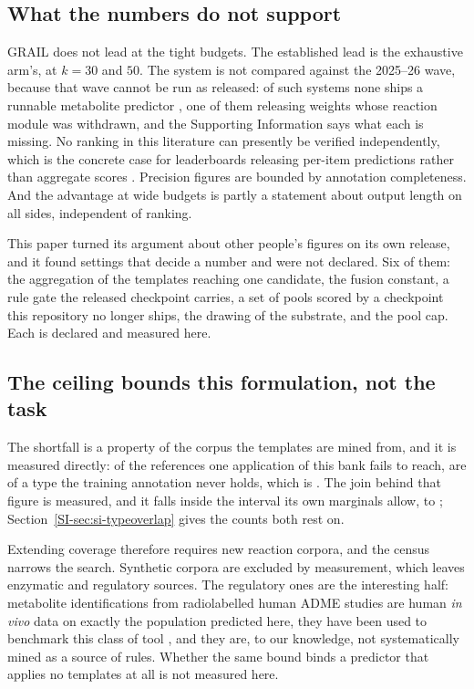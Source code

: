 \subsection{What the numbers do not support}

GRAIL does not lead at the tight budgets.  The established lead is the exhaustive arm's, at $k=30$ and $50$. The system is not compared against the 2025--26 wave, because that wave cannot be run as
released: of \numComparatorsUnavailableWord{} such systems none ships a runnable metabolite
predictor \citep{Larsson_2025, Zhou_2025, Zhou_2026, Chavan_2026}, one of them releasing weights
whose reaction module was withdrawn, and the Supporting Information says what each is missing. No ranking in this literature can presently be verified independently, which
is the concrete case for leaderboards releasing per-item predictions rather than aggregate scores
\citep{Rodriguez_2021, Mishra_2021}. Precision figures are bounded by annotation completeness. And the advantage at
wide budgets is partly a statement about output length on all sides, independent of ranking.

This paper turned its argument about other people's figures on its own release, and it
found settings that decide a number and were not declared. Six of them: the aggregation of the templates reaching one candidate, the fusion constant, a rule gate the released checkpoint carries, a set of pools scored by a checkpoint this repository no longer ships, the drawing of the substrate, and the pool cap. Each is declared and measured here.

\subsection{The ceiling bounds this formulation, not the task}

The shortfall is a property of the corpus the templates are mined from, and it is measured directly: of the \numCeilingUncovered{} references one
application of this bank fails to reach, \numContainmentAbsent{} are of a type the training
annotation never holds, which is \numContainmentShortfallsharePct{}. The join behind that figure is
measured, and it falls inside the interval its own marginals allow, \numBoundShortfallsharemin{}
to \numBoundShortfallsharemax{}; Section~\ref{SI-sec:si-typeoverlap} gives the counts both rest on.

Extending coverage therefore requires new reaction corpora, and the census narrows the search.
Synthetic corpora are excluded by measurement, which leaves enzymatic and regulatory sources. The
regulatory ones are the interesting half: metabolite identifications from radiolabelled human
ADME studies are human \emph{in vivo} data on exactly the population predicted here, they have
been used to benchmark this class of tool \citep{Gao_2026}, and they are, to our knowledge, not
systematically mined as a source of rules. Whether the same bound binds a predictor that applies no templates at all is not measured here.

